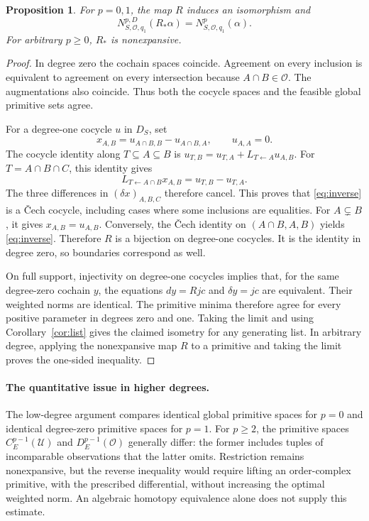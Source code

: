 \documentclass[11pt,a4paper]{article}
\numberwithin{equation}{section}
\newtheorem{proposition}[theorem]{Proposition}
\theoremstyle{remark}
\newcommand{\OO}{\mathcal O}
\begin{document}
\begin{proposition}\label{prop:order}
For $p=0,1$, the map $R$ induces an isomorphism and
\[
 N^{p,D}_{S,\OO,q_1}(R_*\alpha)=N^p_{S,\OO,q_1}(\alpha).
\]
For arbitrary $p\ge0$, $R_*$ is nonexpansive.
\end{proposition}
\begin{proof}
In degree zero the cochain spaces coincide. Agreement on every inclusion is equivalent to agreement on every intersection because $A\cap B\in\OO$. The augmentations also coincide. Thus both the cocycle spaces and the feasible global primitive sets agree.

For a degree-one cocycle $u$ in $D_S$, set
\begin{equation}\label{eq:inverse}
 x_{A,B}=u_{A\cap B,B}-u_{A\cap B,A},\qquad u_{A,A}=0.
\end{equation}
The cocycle identity along $T\subseteq A\subseteq B$ is
$u_{T,B}=u_{T,A}+L_{T\leftarrow A}u_{A,B}$.
For $T=A\cap B\cap C$, this identity gives
\[
 L_{T\leftarrow A\cap B}x_{A,B}=u_{T,B}-u_{T,A}.
\]
The three differences in $(\delta x)_{A,B,C}$ therefore cancel. This proves that \eqref{eq:inverse} is a \v{C}ech cocycle, including cases where some inclusions are equalities. For $A\subsetneq B$, it gives $x_{A,B}=u_{A,B}$. Conversely, the \v{C}ech identity on $(A\cap B,A,B)$ yields \eqref{eq:inverse}. Therefore $R$ is a bijection on degree-one cocycles. It is the identity in degree zero, so boundaries correspond as well.

On full support, injectivity on degree-one cocycles implies that, for the same degree-zero cochain $y$, the equations $dy=Rjc$ and $\delta y=jc$ are equivalent. Their weighted norms are identical. The primitive minima therefore agree for every positive parameter in degrees zero and one. Taking the limit and using Corollary~\ref{cor:list} gives the claimed isometry for any generating list. In arbitrary degree, applying the nonexpansive map $R$ to a primitive and taking the limit proves the one-sided inequality.
\end{proof}

\paragraph{The quantitative issue in higher degrees.}
The low-degree argument compares identical global primitive spaces for $p=0$ and identical degree-zero primitive spaces for $p=1$. For $p\ge2$, the primitive spaces $C_E^{p-1}(\mathcal U)$ and $D_E^{p-1}(\OO)$ generally differ: the former includes tuples of incomparable observations that the latter omits. Restriction remains nonexpansive, but the reverse inequality would require lifting an order-complex primitive, with the prescribed differential, without increasing the optimal weighted norm. An algebraic homotopy equivalence alone does not supply this estimate.
\end{document}
